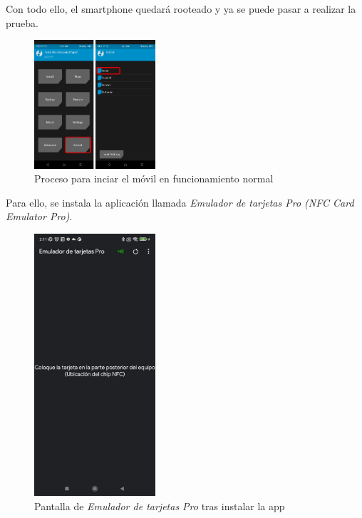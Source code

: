 \documentclass[12pt,a4paper,onecolumn,oneside]{report}
\begin{document}
Con todo ello, el smartphone quedará rooteado y ya se puede pasar a realizar la prueba.

\begin{figure}[h] 
\centering
  \includegraphics[width=0.4\textwidth]{figuras/root55.png}
  \caption[Proceso para inciar el móvil en funcionamiento normal]{Proceso para inciar el móvil en funcionamiento normal\\
  }
  \label{fig:root55}
\end{figure}

Para ello, se instala la aplicación llamada \textit{Emulador de tarjetas Pro (NFC Card Emulator Pro)}. 


\begin{figure}[h] 
\centering
  \includegraphics[width=0.4\textwidth]{figuras/root6.png}
  \caption[Pantalla de \textit{Emulador de tarjetas Pro} tras instalar la app]{Pantalla de \textit{Emulador de tarjetas Pro} tras instalar la app\\
  }
  \label{fig:root6}
\end{figure}
\end{document}
